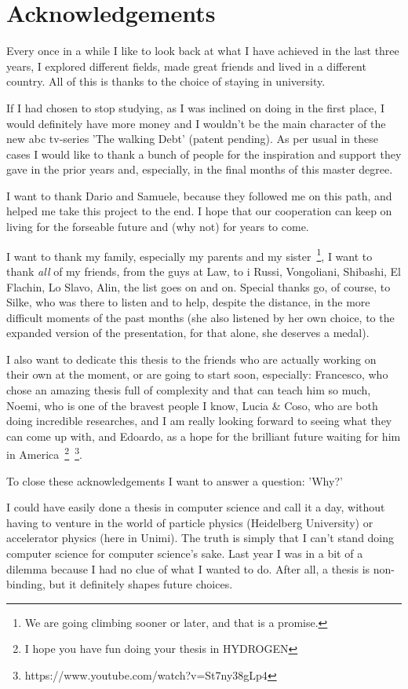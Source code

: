 \chapter*{Acknowledgements}
Every once in a while I like to look back at what I have achieved in the last three years, I
explored different fields, made great friends and lived in a different country. All of this is
thanks to the choice of staying in university.

If I had chosen to stop studying, as I was inclined on doing in the first place, I would definitely
have more money and I wouldn't be the main character of the new abc tv-series 'The walking Debt'
(patent pending). As per usual in these cases I would like to thank a bunch of people for the
inspiration and support they gave in the prior years and, especially, in the final months of this
master degree.

I want to thank Dario and Samuele, because they followed me on this path, and helped me take this
project to the end. I hope that our cooperation can keep on living for the forseable future and (why
not) for years to come.

I want to thank my family, especially my parents and my sister~\footnote{
	We are going climbing sooner or later, and that is a promise.
}, I want to thank \emph{all} of my friends, from the guys at Law, to i Russi, Vongoliani, Shibashi, El
Flachin, Lo Slavo, Alin, the list goes on and on. Special thanks go, of course, to Silke, who was
there to listen and to help, despite the distance, in the more difficult moments of the past months
(she also listened by her own choice, to the expanded version of the presentation, for that alone,
she deserves a medal).

I also want to dedicate this thesis to the friends who are actually working on their own at the
moment, or are going to start soon, especially: Francesco, who chose an amazing thesis full of
complexity and that can teach him so much, Noemi, who is one of the bravest people I know, Lucia \&
Coso, who are both doing incredible researches, and I am really looking forward to seeing what they can
come up with, and Edoardo, as a hope for the brilliant future waiting for him in America~\footnote{
	I hope you have fun doing your thesis in HYDROGEN
}~\footnote{
	https://www.youtube.com/watch?v=St7ny38gLp4
}.

To close these acknowledgements I want to answer a question: 'Why?'

I could have easily done a thesis in computer science and call it a day, without having to venture
in the world of particle physics (Heidelberg University) or accelerator physics (here in Unimi). The
truth is simply that I can't stand doing computer science for computer science's sake. Last year I
was in a bit of a dilemma because I had no clue of what I wanted to do. After all, a thesis is
non-binding, but it definitely shapes future choices.

